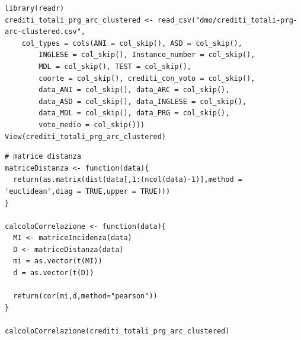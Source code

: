 \documentclass[12pt]{article}
\begin{document}
\lstset{%
   breaklines=true
}

\begin{lstlisting}[caption={Importazione degli attributi crediti totali, architetture, programmazione e cluster.}, label={datacluster}, captionpos=b, style = R]
library(readr)
crediti_totali_prg_arc_clustered <- read_csv("dmo/crediti_totali-prg-arc-clustered.csv", 
    col_types = cols(ANI = col_skip(), ASD = col_skip(), 
        INGLESE = col_skip(), Instance_number = col_skip(), 
        MDL = col_skip(), TEST = col_skip(), 
        coorte = col_skip(), crediti_con_voto = col_skip(), 
        data_ANI = col_skip(), data_ARC = col_skip(), 
        data_ASD = col_skip(), data_INGLESE = col_skip(), 
        data_MDL = col_skip(), data_PRG = col_skip(), 
        voto_medio = col_skip()))
View(crediti_totali_prg_arc_clustered)
\end{lstlisting}

\begin{lstlisting}[caption={Calcolo Matrice di incidenza dei cluster, delle distanze e correlazione tra le due matrici.}, label={matrix-cor1}, captionpos=b, style = R]
# matrice distanza
matriceDistanza <- function(data){
  return(as.matrix(dist(data[,1:(ncol(data)-1)],method = 'euclidean',diag = TRUE,upper = TRUE)))
}

calcoloCorrelazione <- function(data){
  MI <- matriceIncidenza(data)
  D <- matriceDistanza(data)
  mi = as.vector(t(MI))
  d = as.vector(t(D))
  
  return(cor(mi,d,method="pearson"))
}

calcoloCorrelazione(crediti_totali_prg_arc_clustered)
\end{lstlisting}	
\end{document}
